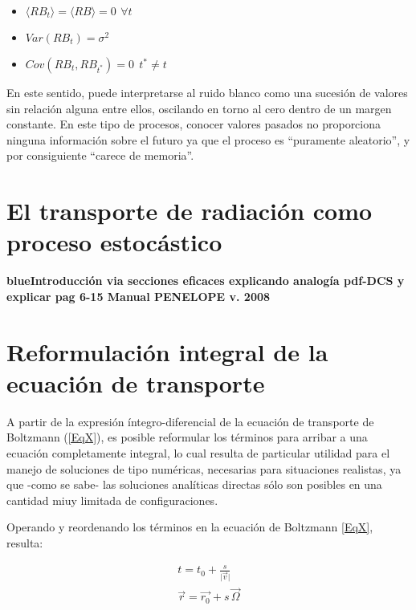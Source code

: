 \begin{itemize}
 \item $\langle RB_{t} \rangle = \langle RB \rangle = 0  \, \: \forall t$
 \item $ Var(RB_{t}) = \sigma^2$
 \item $ Cov(RB_{t}, RB_{t^*}) = 0 \; \, t^* \ne t$
\end{itemize}

En este sentido, puede interpretarse al ruido blanco como una sucesi\'on de valores sin relaci\'on alguna entre ellos, oscilando en torno 
al cero dentro de un margen constante. 
%
En este tipo de procesos, conocer valores pasados no proporciona ninguna informaci\'on sobre el futuro ya que el proceso es ``puramente 
aleatorio'', y por consiguiente ``carece de memoria''.

\section{El transporte de radiaci\'on como proceso estoc\'astico}
\label{CapVI_8}

\begin{center}
{\bf {blue}{Introducci\'on via secciones eficaces explicando analog\'ia pdf-DCS y explicar pag 6-15 Manual PENELOPE v. 2008}}
\end{center}


\section{Reformulaci\'on integral de la ecuaci\'on de transporte}
\label{CapVI_9}

A partir de la expresi\'on \'integro-diferencial de la ecuaci\'on de transporte de Boltzmann (\ref{EqX}), es posible reformular los 
t\'erminos para arribar a una ecuaci\'on completamente integral, lo cual resulta de particular utilidad para el manejo de soluciones 
de tipo num\'ericas, necesarias para situaciones realistas, ya que -como se sabe- las soluciones anal\'iticas directas s\'olo son 
posibles en una cantidad miuy limitada de configuraciones.
%

Operando y reordenando los t\'erminos en la ecuaci\'on de Boltzmann \ref{EqX}, resulta:


\begin{eqnarray}
 t = t_{0} + \frac{s}{\lvert\vec{v}\rvert}       \nonumber \\
 \vec{r} = \vec{r_{0}} + s\, \vec{\Omega}
 \label{EcXI}
\end{eqnarray}

